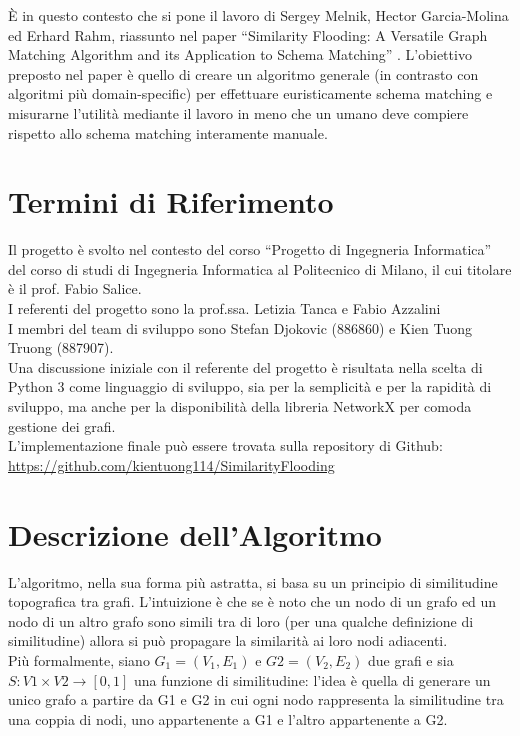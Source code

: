 \documentclass[a4paper,10pt]{article}
\begin{document}
È in questo contesto che si pone il lavoro di Sergey Melnik, Hector Garcia-Molina ed Erhard Rahm, riassunto nel paper “Similarity Flooding: A Versatile Graph Matching Algorithm
and its Application to Schema Matching” \cite{sfpaper}. L’obiettivo preposto nel paper è quello di creare un algoritmo generale (in contrasto con algoritmi più domain-specific) per effettuare euristicamente schema matching e misurarne l’utilità mediante il lavoro in meno che un umano deve compiere rispetto allo schema matching interamente manuale.


\section{Termini di Riferimento}

Il progetto è svolto nel contesto del corso “Progetto di Ingegneria Informatica” del corso di studi di Ingegneria Informatica al Politecnico di Milano, il cui titolare è il prof. Fabio Salice.\\

I referenti del progetto sono la prof.ssa. Letizia Tanca e Fabio Azzalini\\

I membri del team di sviluppo sono Stefan Djokovic (886860) e Kien Tuong Truong (887907).\\

Una discussione iniziale con il referente del progetto è risultata nella scelta di Python 3 come linguaggio di sviluppo, sia per la semplicità e per la rapidità di sviluppo, ma anche per la disponibilità della libreria NetworkX per comoda gestione dei grafi.\\

L’implementazione finale può essere trovata sulla repository di Github:\\
\url{https://github.com/kientuong114/SimilarityFlooding}


\section{Descrizione dell'Algoritmo}

L’algoritmo, nella sua forma più astratta, si basa su un principio di similitudine topografica tra grafi. L’intuizione è che se è noto che un nodo di un grafo ed un nodo di un altro grafo sono simili tra di loro (per una qualche definizione di similitudine) allora si può propagare la similarità ai loro nodi adiacenti.\\
Più formalmente, siano $G_1 = (V_1, E_1)$ e $G2 = (V_2, E_2) $ due grafi e sia \\ $S: V1\times V2 \to [0, 1]$ una funzione di similitudine: l’idea è quella di generare un unico grafo a partire da G1 e G2 in cui ogni nodo rappresenta la similitudine tra una coppia di nodi, uno appartenente a G1 e l’altro appartenente a G2.\\
\end{document}
